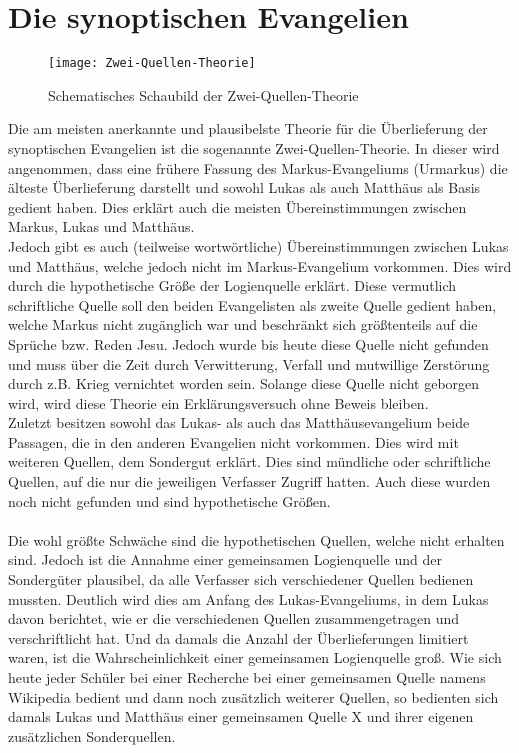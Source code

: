 \section{Die synoptischen Evangelien}
\begin{figure}[h]
    \begin{center}
        \texttt{[image: Zwei-Quellen-Theorie]}\label{Quellentheorie}
        \caption{Schematisches Schaubild der Zwei-Quellen-Theorie}
    \end{center}
\end{figure}
Die am meisten anerkannte und plausibelste Theorie für die Überlieferung der synoptischen Evangelien ist die sogenannte Zwei-Quellen-Theorie. In dieser wird angenommen, dass eine frühere Fassung des Markus-Evangeliums (Urmarkus) die älteste Überlieferung darstellt und sowohl Lukas als auch Matthäus als Basis gedient haben. Dies erklärt auch die meisten Übereinstimmungen zwischen Markus, Lukas und Matthäus.\\

Jedoch gibt es auch (teilweise wortwörtliche) Übereinstimmungen  zwischen Lukas und Matthäus, welche jedoch nicht im Markus-Evangelium vorkommen. Dies wird durch die hypothetische Größe der Logienquelle erklärt. Diese vermutlich schriftliche Quelle soll den beiden Evangelisten als zweite Quelle gedient haben, welche Markus nicht zugänglich war und beschränkt sich größtenteils auf die Sprüche bzw. Reden Jesu. Jedoch wurde bis heute diese Quelle nicht gefunden und muss über die Zeit durch Verwitterung, Verfall und mutwillige Zerstörung durch z.B. Krieg vernichtet worden sein. Solange diese Quelle nicht geborgen wird, wird diese Theorie ein Erklärungsversuch ohne Beweis bleiben.\\

Zuletzt besitzen sowohl das Lukas- als auch das Matthäusevangelium beide Passagen, die in den anderen Evangelien nicht vorkommen. Dies wird mit weiteren Quellen, dem Sondergut erklärt. Dies sind mündliche oder schriftliche Quellen, auf die nur die jeweiligen Verfasser Zugriff hatten. Auch diese wurden noch nicht gefunden und sind hypothetische Größen.
\\~\\
Die wohl größte Schwäche sind die hypothetischen Quellen, welche nicht erhalten sind. Jedoch ist die Annahme einer gemeinsamen Logienquelle und der Sondergüter plausibel, da alle Verfasser sich verschiedener Quellen bedienen mussten. Deutlich wird dies am Anfang des Lukas-Evangeliums, in dem Lukas davon berichtet, wie er die verschiedenen Quellen zusammengetragen und verschriftlicht hat. Und da damals die Anzahl der Überlieferungen limitiert waren, ist die Wahrscheinlichkeit einer gemeinsamen Logienquelle groß. Wie sich heute jeder Schüler bei einer Recherche bei einer gemeinsamen Quelle namens Wikipedia bedient und dann noch zusätzlich weiterer Quellen, so bedienten sich damals Lukas und Matthäus einer gemeinsamen Quelle X und ihrer eigenen zusätzlichen Sonderquellen.\\


